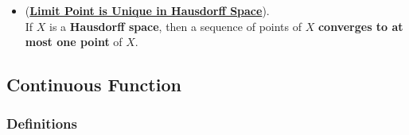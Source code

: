 \documentclass[11pt]{article}
\begin{document}
\begin{itemize}
\item \begin{proposition} (\underline{\textbf{Limit Point is Unique in Hausdorff Space}}). \citep{munkres2000topology} \\
If $X$ is a \textbf{Hausdorff space}, then a sequence of points of $X$ \textbf{converges to at most one point} of $X$.
\end{proposition}
\end{itemize}


\subsection{Continuous Function}
\subsubsection{Definitions}
\end{document}
